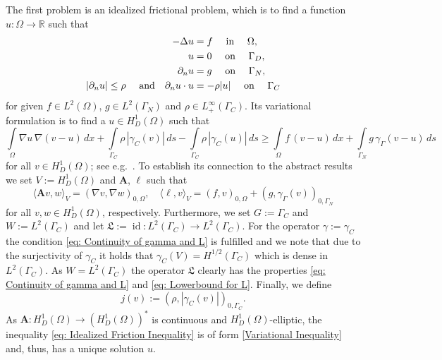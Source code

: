 \documentclass[12pt,twoside,reqno]{amsart}
\theoremstyle{definition}
\numberwithin{equation}{section}
\renewcommand{\L}{\mathfrak{L}}
\newcommand{\A} {\bm{A}}
\newcommand{\lin} {\bm{\ell}}
\begin{document}
            
            The first problem is an idealized frictional problem, which is to find a function $u:\Omega \rightarrow \mathbb{R}$ such that 
            \begin{equation*}
            \aligned
                -\Delta u&= f\quad\text{ in }\quad\Omega,\\
                  u &= 0\quad\text{ on }\quad \Gamma_D,\\
                \partial_nu &= g\quad\text{ on }\quad \Gamma_N,\\
                |\partial_nu|\leq \rho \quad \text{ and} \quad \partial_n u \cdot u & = - \rho |u| \quad \text{ on }\quad \Gamma_C
                \endaligned
            \end{equation*}
            for given $f\in L^2(\Omega)$, $g\in L^2(\Gamma_N)$ and $\rho\in L^{\infty}_+(\Gamma_C)$. Its variational formulation is to find a $u\in H^1_D(\Omega)$ such that
            \begin{equation}\label{eq: Idealized Friction Inequality}
                \int\limits_{\Omega}\nabla u\,\nabla(v-u)\,dx + \int\limits_{\Gamma_C}\rho\,|\gamma_C(v)|\,ds - \int\limits_{\Gamma_C}\rho\,|\gamma_C(u)|\,ds \geq \int\limits_{\Omega}f\,(v-u)\,dx +\int\limits_{\Gamma_N}g\,\gamma_\Gamma(v-u)\,ds
            \end{equation}
            for all $v\in H^1_D(\Omega)$; see e.g.~\cite[Ch.~2]{Hlavacek1988a}.
            To establish its connection to the abstract results we set $V:=H^1_D(\Omega)$ and $\A$, $\lin$ such that
            \begin{equation*}
                \langle \A v,w\rangle_V=(\nabla v,\nabla w)_{0,\Omega},\quad \langle \lin ,v\rangle_V=(f,v)_{0,\Omega}+(g,\gamma_\Gamma(v))_{0,\Gamma_N}
            \end{equation*}
            for all $v,w\in H^1_D(\Omega)$, respectively. Furthermore, we set $G:=\Gamma_C$ and $W:= L^2(\Gamma_C)$ and let $\L:=\operatorname{id}:L^2(\Gamma_C)\to L^2(\Gamma_C)$. For the operator $\gamma:=\gamma_C$ the condition \eqref{eq: Continuity of gamma and L} is fulfilled and we note that due to the surjectivity of $\gamma_C$ it holds that $\gamma_C(V)=H^{1/2}(\Gamma_C)$ which is dense in $L^2 (\Gamma_C)$. As $W = L^2(\Gamma_C)$ the operator $\L$ clearly has the properties \eqref{eq: Continuity of gamma and L} and \eqref{eq: Lowerbound for L}.
            Finally, we define
            \begin{equation*}
                j(v):= (\rho,|\gamma_C(v)|)_{0,\Gamma_C}.
            \end{equation*}
            As $\A:H^1_D(\Omega)\to \left(H^1_D(\Omega)\right)^*$ is continuous and $H^1_D(\Omega)$-elliptic, the inequality \eqref{eq: Idealized Friction Inequality} is of form \eqref{Variational Inequality} and, thus, has a unique solution $u$.
\end{document}
